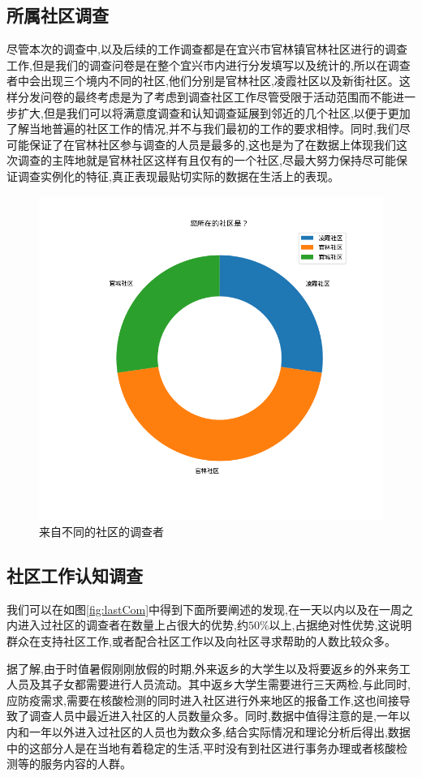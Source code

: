 \documentclass[AutoFakeBold]{LZUThesis}
\begin{document}
\subsection{所属社区调查}
尽管本次的调查中,以及后续的工作调查都是在宜兴市官林镇官林社区进行的调查工作,但是我们的调查问卷是在整个宜兴市内进行分发填写以及统计的,所以在调查者中会出现三个境内不同的社区,他们分别是官林社区,凌霞社区以及新街社区。这样分发问卷的最终考虑是为了考虑到调查社区工作尽管受限于活动范围而不能进一步扩大,但是我们可以将满意度调查和认知调查延展到邻近的几个社区,以便于更加了解当地普遍的社区工作的情况,并不与我们最初的工作的要求相悖。同时,我们尽可能保证了在官林社区参与调查的人员是最多的,这也是为了在数据上体现我们这次调查的主阵地就是官林社区这样有且仅有的一个社区,尽最大努力保持尽可能保证调查实例化的特征,真正表现最贴切实际的数据在生活上的表现。

\begin{figure}[!h]
	\centering
	\includegraphics[width=4 in]{figures/community.png}
	\caption{来自不同的社区的调查者}
	\label{fig:community}
\end{figure}

\subsection{社区工作认知调查}
我们可以在如图\ref{fig:lastCom}中得到下面所要阐述的发现,在一天以内以及在一周之内进入过社区的调查者在数量上占很大的优势,约$50\%$以上,占据绝对性优势,这说明群众在支持社区工作,或者配合社区工作以及向社区寻求帮助的人数比较众多。

据了解,由于时值暑假刚刚放假的时期,外来返乡的大学生以及将要返乡的外来务工人员及其子女都需要进行人员流动。其中返乡大学生需要进行三天两检,与此同时,应防疫需求,需要在核酸检测的同时进入社区进行外来地区的报备工作,这也间接导致了调查人员中最近进入社区的人员数量众多。同时,数据中值得注意的是,一年以内和一年以外进入过社区的人员也为数众多,结合实际情况和理论分析后得出,数据中的这部分人是在当地有着稳定的生活,平时没有到社区进行事务办理或者核酸检测等的服务内容的人群。
\end{document}
